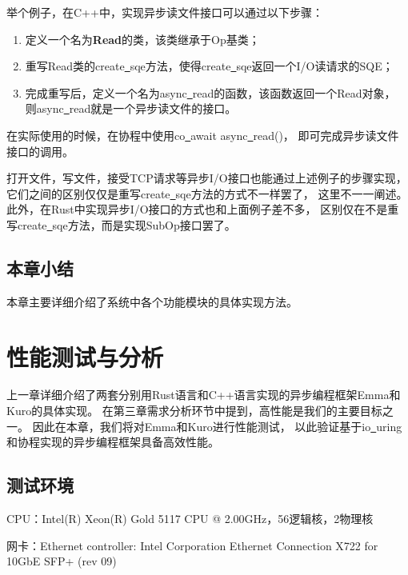 \documentclass[supercite]{HustGraduPaper}
\theoremstyle{definition}
\begin{document}
举个例子，在C++中，实现异步读文件接口可以通过以下步骤：

\begin{enumerate}
  \item 定义一个名为\textbf{Read}的类，该类继承于Op基类；
  \item 重写Read类的create\underline{~}sqe方法，使得create\underline{~}sqe返回一个I/O读请求的SQE；
  \item 完成重写后，定义一个名为async\underline{~}read的函数，该函数返回一个Read对象，
    则async\underline{~}read就是一个异步读文件的接口。
\end{enumerate}

在实际使用的时候，在协程中使用co\underline{~}await async\underline{~}read()，
即可完成异步读文件接口的调用。\par

打开文件，写文件，接受TCP请求等异步I/O接口也能通过上述例子的步骤实现，
它们之间的区别仅仅是重写create\underline{~}sqe方法的方式不一样罢了，
这里不一一阐述。此外，在Rust中实现异步I/O接口的方式也和上面例子差不多，
区别仅在不是重写create\underline{~}sqe方法，而是实现SubOp接口罢了。\par

\subsection{本章小结}

本章主要详细介绍了系统中各个功能模块的具体实现方法。\par

\section{性能测试与分析}
上一章详细介绍了两套分别用Rust语言和C++语言实现的异步编程框架Emma和Kuro的具体实现。
在第三章需求分析环节中提到，高性能是我们的主要目标之一。
因此在本章，我们将对Emma和Kuro进行性能测试，
以此验证基于io\underline{~}uring和协程实现的异步编程框架具备高效性能。\par

\subsection{测试环境}
CPU：Intel(R) Xeon(R) Gold 5117 CPU @ 2.00GHz，56逻辑核，2物理核\par

网卡：Ethernet controller: Intel Corporation Ethernet Connection X722 for 10GbE SFP+ (rev 09)\par
\end{document}
